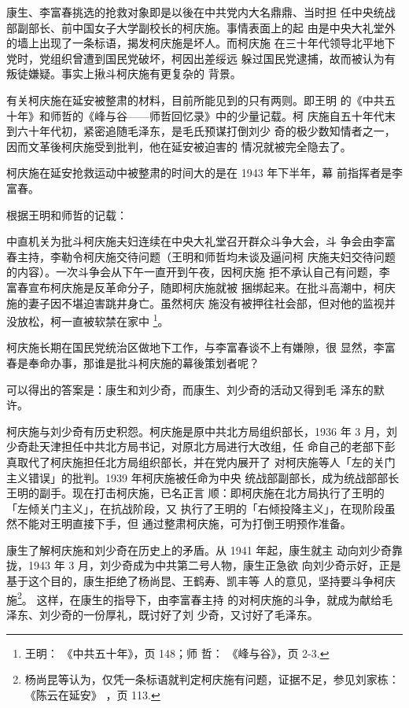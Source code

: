 康生、李富春挑选的抢救对象即是以後在中共党内大名鼎鼎、当时担
任中央统战部副部长、前中国女子大学副校长的柯庆施。事情表面上的起
由是中央大礼堂外的墙上出现了一条标语，揭发柯庆施是坏人。而柯庆施
在三十年代领导北平地下党时，党组织曾遭到国民党破坏，柯因出差绥远
躲过国民党逮捕，故而被认为有叛徒嫌疑。事实上揪斗柯庆施有更复杂的
背景。

有关柯庆施在延安被整肃的材料，目前所能见到的只有两则。即王明
的《中共五十年》和师哲的《峰与谷——师哲回忆录》中的少量记载。柯
庆施自五十年代末到六十年代初，紧密追随毛泽东，是毛氏预谋打倒刘少
奇的极少数知情者之一，因而文革後柯庆施受到批判，他在延安被迫害的
情况就被完全隐去了。

柯庆施在延安抢救运动中被整肃的时间大的是在 1943 年下半年，幕
前指挥者是李富春。

根据王明和师哲的记载：

中直机关为批斗柯庆施夫妇连续在中央大礼堂召开群众斗争大会，斗 争会由李富
春主持，李勒令柯庆施交待问题（王明和师哲均未谈及逼问柯 庆施夫妇交待问题
的内容）。一次斗争会从下午一直开到午夜，因柯庆施 拒不承认自己有问题，李
富春宣布柯庆施是反革命分子，随即柯庆施就被 捆绑起来。在批斗高潮中，柯庆
施的妻子因不堪迫害跳井身亡。虽然柯庆 施没有被押往社会部，但对他的监视并
没放松，柯一直被软禁在家中 \footnote{王明： 《中共五十年》，页 148；师
哲： 《峰与谷》，页 2-3.}。

柯庆施长期在国民党统治区做地下工作，与李富春谈不上有嫌隙，很
显然，李富春是奉命办事，那谁是批斗柯庆施的幕後策划者呢？

可以得出的答案是：康生和刘少奇，而康生、刘少奇的活动又得到毛
泽东的默许。

柯庆施与刘少奇有历史积怨。柯庆施是原中共北方局组织部长，1936
年 3 月，刘少奇赴天津担任中共北方局书记，对原北方局进行大改组，任
命自己的老部下彭真取代了柯庆施担任北方局组织部长，并在党内展开了
对柯庆施等人「左的关门主义错误」的批判。1939 年柯庆施被任命为中央
统战部副部长，成为统战部部长王明的副手。现在打击柯庆施，已名正言
顺：即柯庆施在北方局执行了王明的「左倾关门主义」，在抗战阶段，又
执行了王明的「右倾投降主义」，在现阶段虽然不能对王明直接下手，但
通过整肃柯庆施，可为打倒王明预作准备。

康生了解柯庆施和刘少奇在历史上的矛盾。从 1941 年起，康生就主
动向刘少奇靠拢，1943 年 3 月，刘少奇成为中共第二号人物，康生正急欲
向刘少奇示好，正是基于这个目的，康生拒绝了杨尚昆、王鹤寿、凯丰等
人的意见，坚持要斗争柯庆施\footnote{杨尚昆等认为，仅凭一条标语就判定柯庆施有问题，证据不足，参见刘家栋：
《陈云在延安》
，页 113.}。
这样，在康生的指导下，由李富春主持
的对柯庆施的斗争，就成为献给毛泽东、刘少奇的一份厚礼，既讨好了刘
少奇，又讨好了毛泽东。

